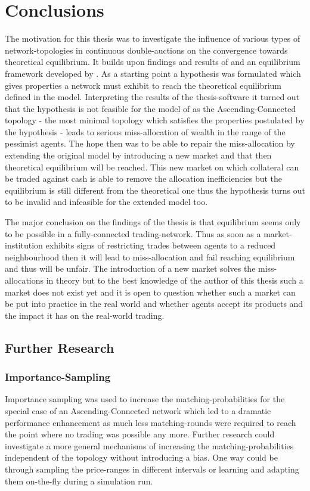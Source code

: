 \documentclass[Bachelorarbeit.tex]{subfiles}
\begin{document}
\chapter{Conclusions}
\label{ch:conclusions}

The motivation for this thesis was to investigate the influence of various types of network-topologies in continuous double-auctions on the convergence towards theoretical equilibrium. It builds upon findings and results of \cite{Breuer2015} and an equilibrium framework developed by \cite{Geanakoplos2009}. As a starting point a hypothesis was formulated which gives properties a network must exhibit to reach the theoretical equilibrium defined in the model. Interpreting the results of the thesis-software it turned out that the hypothesis is not feasible for the model of \cite{Breuer2015} as the Ascending-Connected topology - the most minimal topology which satisfies the properties postulated by the hypothesis - leads to serious miss-allocation of wealth in the range of the pessimist agents. The hope then was to be able to repair the miss-allocation by extending the original model by introducing a new market and that then theoretical equilibrium will be reached. This new market on which collateral can be traded against cash is able to remove the allocation inefficiencies but the equilibrium is still different from the theoretical one thus the hypothesis turns out to be invalid and infeasible for the extended model too.

\bigskip

The major conclusion on the findings of the thesis is that equilibrium seems only to be possible in a fully-connected trading-network. Thus as soon as a market-institution exhibits signs of restricting trades between agents to a reduced neighbourhood then it will lead to miss-allocation and fail reaching equilibrium and thus will be unfair. The introduction of a new market solves the miss-allocations in theory but to the best knowledge of the author of this thesis such a market does not exist yet and it is open to question whether such a market can be put into practice in the real world and whether agents accept its products and the impact it has on the real-world trading.

\section*{Further Research}

\subsection*{Importance-Sampling}
Importance sampling was used to increase the matching-probabilities for the special case of an Ascending-Connected network which led to a dramatic performance enhancement as much less matching-rounds were required to reach the point where no trading was possible any more. Further research could investigate a more general mechanisms of increasing the matching-probabilities independent of the topology without introducing a bias. One way could be through sampling the price-ranges in different intervals or learning and adapting them on-the-fly during a simulation run.
\end{document}
